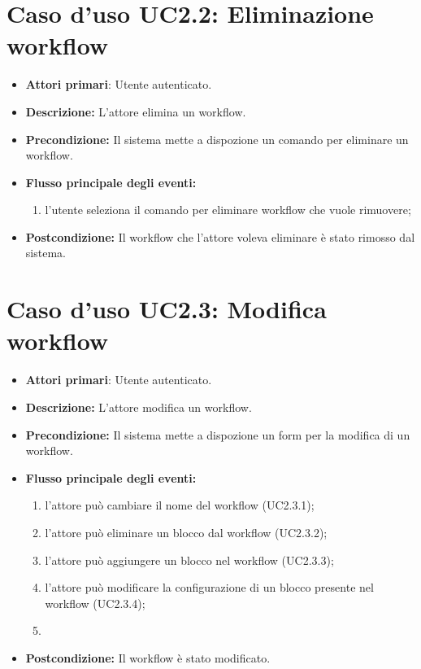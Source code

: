 		\section{Caso d'uso UC2.2: Eliminazione workflow}
		\begin{itemize}
			\item \textbf{Attori primari}: Utente autenticato.
			\item \textbf{Descrizione:} L'attore elimina un workflow.
			\item \textbf{Precondizione:} Il sistema mette a dispozione un comando per eliminare un workflow.
			\item \textbf{Flusso principale degli eventi:}
			\begin{enumerate}
				\item l'utente seleziona il comando per eliminare workflow che vuole rimuovere;
			\end{enumerate}
			\item \textbf{Postcondizione:} Il workflow che l'attore voleva eliminare è stato rimosso dal sistema.
		\end{itemize}
		\section{Caso d'uso UC2.3: Modifica workflow}
		\begin{itemize}
			\item \textbf{Attori primari}: Utente autenticato.
			\item \textbf{Descrizione:} L'attore modifica un workflow.
			\item \textbf{Precondizione:} Il sistema mette a dispozione un form per la modifica di un workflow.
			\item \textbf{Flusso principale degli eventi:}
			\begin{enumerate}
				\item l'attore può cambiare il nome del workflow (UC2.3.1);
				\item l'attore può eliminare un blocco dal workflow (UC2.3.2);
				\item l'attore può aggiungere un blocco nel workflow (UC2.3.3);
				\item l'attore può modificare la configurazione di un blocco presente nel workflow (UC2.3.4);
				\item 
			\end{enumerate}
			\item \textbf{Postcondizione:} Il workflow è stato modificato.
		\end{itemize}
